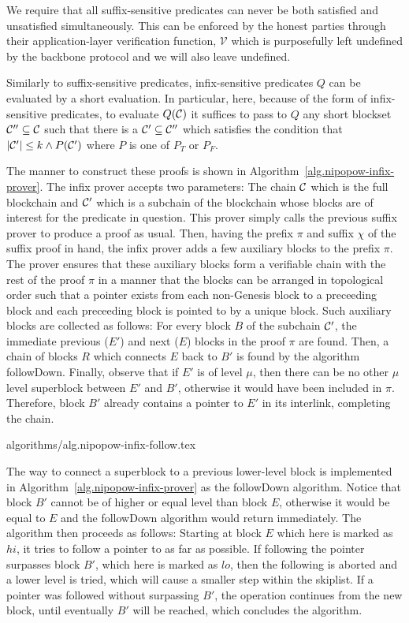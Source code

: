 We require that all suffix-sensitive predicates can never be both satisfied and
unsatisfied simultaneously. This can be enforced by the honest parties through
their application-layer verification function, $\mathcal{V}$ which is
purposefully left undefined by the backbone protocol and we will also leave
undefined.

Similarly to suffix-sensitive predicates, infix-sensitive predicates $Q$ can be
evaluated by a short evaluation. In particular, here, because of the form of
infix-sensitive predicates, to evaluate $Q(\mathcal{C})$ it suffices to pass to $Q$
any short blockset $\mathcal{C}'' \subseteq \mathcal{C}$ such that there is a $\mathcal{C}'
\subseteq \mathcal{C}''$ which satisfies the condition that $|\mathcal{C}'| \leq k \land
P(\mathcal{C}')$ where $P$ is one of $P_T$ or $P_F$.

The manner to construct these proofs is shown in
Algorithm~\ref{alg.nipopow-infix-prover}. The infix prover accepts two
parameters: The chain $\mathcal{C}$ which is the full blockchain and $\mathcal{C}'$ which
is a subchain of the blockchain whose blocks are of interest for the predicate
in question. This prover simply calls the previous suffix prover to produce a
proof as usual. Then, having the prefix $\pi$ and suffix $\chi$ of the suffix
proof in hand, the infix prover adds a few auxiliary blocks to the prefix
$\pi$. The prover ensures that these auxiliary blocks form a verifiable chain
with the rest of the proof $\pi$ in a manner that the blocks can be arranged in
topological order such that a pointer exists from each non-Genesis block to a
preceeding block and each preceeding block is pointed to by a unique block.
Such auxiliary blocks are collected as follows: For every block $B$ of the
subchain $\mathcal{C}'$, the immediate previous ($E'$) and next ($E$) blocks in the
proof $\pi$ are found. Then, a chain of blocks $R$ which connects $E$ back to
$B'$ is found by the algorithm followDown. Finally, observe that if $E'$ is of
level $\mu$, then there can be no other $\mu$ level superblock between $E'$ and
$B'$, otherwise it would have been included in $\pi$. Therefore, block $B'$
already contains a pointer to $E'$ in its interlink, completing the chain.

{algorithms/alg.nipopow-infix-follow.tex}

The way to connect a superblock to a previous lower-level block is implemented
in Algorithm~\ref{alg.nipopow-infix-prover} as the followDown algorithm. Notice
that block $B'$ cannot be of higher or equal level than block $E$, otherwise it
would be equal to $E$ and the followDown algorithm would return immediately.
The algorithm then proceeds as follows: Starting at block $E$ which here is
marked as $hi$, it tries to follow a pointer to as far as possible. If
following the pointer surpasses block $B'$, which here is marked as $lo$, then
the following is aborted and a lower level is tried, which will cause a smaller
step within the skiplist. If a pointer was followed without surpassing $B'$,
the operation continues from the new block, until eventually $B'$ will be
reached, which concludes the algorithm.

